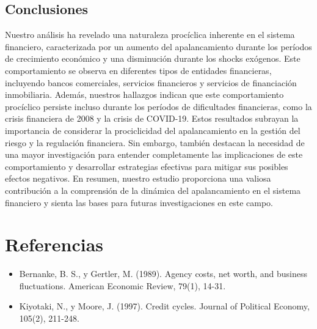 \documentclass[a4paper,fleqn]{cas-sc}
\begin{document}
\subsection{Conclusiones}
Nuestro análisis ha revelado una naturaleza procíclica inherente en el sistema financiero, caracterizada por un aumento del apalancamiento durante los períodos de crecimiento económico y una disminución durante los shocks exógenos. Este comportamiento se observa en diferentes tipos de entidades financieras, incluyendo bancos comerciales, servicios financieros y servicios de financiación inmobiliaria. Además, nuestros hallazgos indican que este comportamiento procíclico persiste incluso durante los períodos de dificultades financieras, como la crisis financiera de 2008 y la crisis de COVID-19. Estos resultados subrayan la importancia de considerar la prociclicidad del apalancamiento en la gestión del riesgo y la regulación financiera. Sin embargo, también destacan la necesidad de una mayor investigación para entender completamente las implicaciones de este comportamiento y desarrollar estrategias efectivas para mitigar sus posibles efectos negativos. En resumen, nuestro estudio proporciona una valiosa contribución a la comprensión de la dinámica del apalancamiento en el sistema financiero y sienta las bases para futuras investigaciones en este campo.


\section{Referencias}
\begin{itemize}
    \item Bernanke, B. S., y Gertler, M. (1989). Agency costs, net worth, and business fluctuations. American Economic Review, 79(1), 14-31.
    \item Kiyotaki, N., y Moore, J. (1997). Credit cycles. Journal of Political Economy, 105(2), 211-248.
\end{itemize}


%

%

\end{document}
